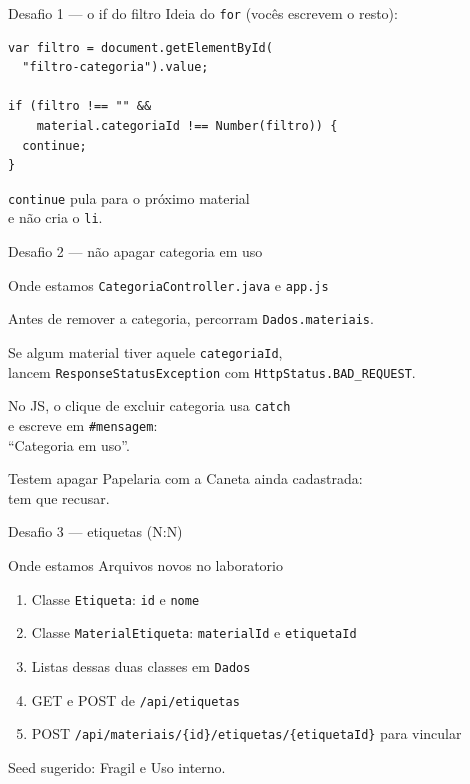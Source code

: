 \documentclass[aspectratio=169,11pt]{beamer}
\newcommand{\onde}[1]{%
  \begin{block}{Onde estamos}
    #1
  \end{block}
}
\begin{document}
\begin{frame}[fragile]{Desafio 1 --- o if do filtro}
  Ideia do \texttt{for} (vocês escrevem o resto):

\begin{lstlisting}[basicstyle=\ttfamily\footnotesize]
var filtro = document.getElementById(
  "filtro-categoria").value;

if (filtro !== "" &&
    material.categoriaId !== Number(filtro)) {
  continue;
}
\end{lstlisting}

  \texttt{continue} pula para o próximo material\\
  e não cria o \texttt{li}.
\end{frame}

\begin{frame}{Desafio 2 --- não apagar categoria em uso}
  \onde{\texttt{CategoriaController.java} e \texttt{app.js}}

  Antes de remover a categoria, percorram
  \texttt{Dados.materiais}.

  \vspace{0.4em}
  Se algum material tiver aquele \texttt{categoriaId},\\
  lancem \texttt{ResponseStatusException} com
  \texttt{HttpStatus.BAD\_REQUEST}.

  \vspace{0.4em}
  No JS, o clique de excluir categoria usa \texttt{catch}\\
  e escreve em \texttt{\#mensagem}:\\
  ``Categoria em uso''.

  \vspace{0.4em}
  Testem apagar Papelaria com a Caneta ainda cadastrada:\\
  tem que recusar.
\end{frame}

\begin{frame}{Desafio 3 --- etiquetas (N{:}N)}
  \onde{Arquivos novos no laboratorio}

  \begin{enumerate}
    \item Classe \texttt{Etiqueta}: \texttt{id} e \texttt{nome}
    \item Classe \texttt{MaterialEtiqueta}:
          \texttt{materialId} e \texttt{etiquetaId}
    \item Listas dessas duas classes em \texttt{Dados}
    \item GET e POST de \texttt{/api/etiquetas}
    \item POST \texttt{/api/materiais/\{id\}/etiquetas/\{etiquetaId\}}
          para vincular
  \end{enumerate}

  \vspace{0.4em}
  Seed sugerido: Fragil e Uso interno.
\end{frame}
\end{document}
